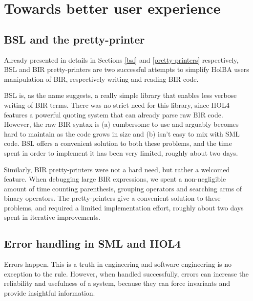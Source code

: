 \documentclass{kththesis}
\begin{document}
{\section{Towards better user experience} \label{towards-user-exp}
\subsection{BSL and the pretty-printer}

Already presented in details in Sections \ref{bsl} and \ref{pretty-printers} respectively, BSL and BIR pretty-printers are two successful attempts to simplify HolBA users manipulation of BIR, respectively writing and reading BIR code.

BSL is, as the name suggests, a really simple library that enables less verbose writing of BIR terms. There was no strict need for this library, since HOL4 features a powerful quoting system that can already parse raw BIR code. However, the raw BIR syntax is (a) cumbersome to use and arguably becomes hard to maintain as the code grows in size and (b) isn't easy to mix with SML code. BSL offers a convenient solution to both these problems, and the time spent in order to implement it has been very limited, roughly about two days.

Similarly, BIR pretty-printers were not a hard need, but rather a welcomed feature. When debugging large BIR expressions, we spent a non-negligible amount of time counting parenthesis, grouping operators and searching arms of binary operators. The pretty-printers give a convenient solution to these problems, and required a limited implementation effort, roughly about two days spent in iterative improvements.

\subsection{Error handling in SML and HOL4}

Errors happen. This is a truth in engineering and software engineering is no exception to the rule. However, when handled successfully, errors can increase the reliability and usefulness of a system, because they can force invariants and provide insightful information.

}
\end{document}

